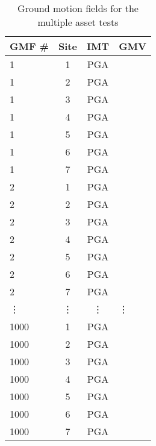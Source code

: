 \begin{table}[htbp]

\centering
\begin{tabular}{ l c c l }

\hline
\rowcolor{anti-flashwhite}
\bf{GMF #} & \bf{Site} & \bf{IMT} & \bf{GMV}\\
\hline
1 & 1 & PGA &  \\
1 & 2 & PGA &  \\
1 & 3 & PGA &  \\
1 & 4 & PGA &  \\
1 & 5 & PGA &  \\
1 & 6 & PGA &  \\
1 & 7 & PGA &  \\
\hline
2 & 1 & PGA &  \\
2 & 2 & PGA &  \\
2 & 3 & PGA &  \\
2 & 4 & PGA &  \\
2 & 5 & PGA &  \\
2 & 6 & PGA &  \\
2 & 7 & PGA &  \\
\hline
\vdots & \vdots & \vdots & \vdots \\
\hline
1000 & 1 & PGA &  \\
1000 & 2 & PGA &  \\
1000 & 3 & PGA &  \\
1000 & 4 & PGA &  \\
1000 & 5 & PGA &  \\
1000 & 6 & PGA &  \\
1000 & 7 & PGA &  \\
\hline
\end{tabular}

\caption{Ground motion fields for the multiple asset tests}
\label{tab:scenario-gmfs-single}
\end{table}